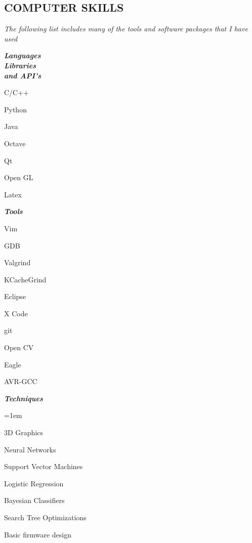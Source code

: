 \documentclass[margin]{res}
\begin{document}
\begin{resume}
\section{COMPUTER SKILLS}{\sl The following list includes many of the tools and software packages that I have used}
									\begin{multicols}{3}[\columnsep 2pt \linewidth 400pt]
									{\sl \textbf{Languages \\ Libraries \\ and API's}} \\
									\begin{list}{}{\leftmargin=1em} \itemsep -2pt
										\item C/C++ 
										\item Python
										\item Java 
										\item Octave 
										\item Qt 
										\item Open GL
										\item Latex
									\end{list}
									\vfill
									\columnbreak
									{\sl \textbf{Tools}} 
									\linebreak
									\linebreak
									\linebreak
							 		\begin{list}{}{\leftmargin=1em}\itemsep -2pt
										\item Vim 
										\item GDB
										\item Valgrind 
										\item KCacheGrind
										\item Eclipse
										\item X Code 
										\item git 
										\item Open CV 
										\item Eagle 
										\item AVR-GCC
									\end{list} \itemsep -2pt
									\vfill
									\columnbreak
			                		{\sl \textbf{Techniques}} \\ 								
									\linebreak
									\linebreak
									\begin{list} {}{\leftmargin=1em}\itemsep -2pt
										\item 3D Graphics 
										\item Neural Networks 
										\item Support Vector Machines 
										\item Logistic Regression 
										\item Bayesian Classifiers 
										\item Search Tree Optimizations 
										\item Basic firmware design 
									\end{list}
								\end{multicols}


\end{resume}
\end{document}
